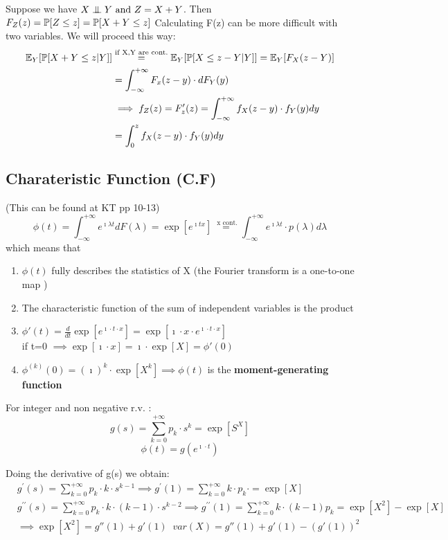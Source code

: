 Suppose we have $X \mathrel{\perp\mspace{-10mu}\perp} Y \text{ and } Z=X+Y$. Then $F_Z(z) = \mathbb{P}[Z\le z] = \mathbb{P}[X+Y \le z]$
Calculating F(z) can be more difficult with two variables. We will proceed this way:
\\
\begin{equation}\begin{split}
    \mathbb{E}_{Y}[\mathbb{P}[X+Y \le z | Y]]  &\stackrel{\text{if X,Y are cont.}}{=} \mathbb{E}_Y [\mathbb{P}[X \le z - Y | Y]] = \mathbb{E}_Y[F_X(z-Y)]\\
    &=\int_{-\infty}^{+\infty}F_x(z-y) \cdot dF_Y(y) \\
    &\implies f_Z(z) = F'_z(z) = \int_{-\infty}^{+\infty}{f_X(z-y)\cdot f_Y(y) dy} \\
    &=\int_{0}^{z}{f_X(z-y) \cdot f_Y(y) dy}
  \end{split}
\end{equation}


\subsection{Charateristic Function (C.F)}
(This can be found at KT pp 10-13)
\begin{equation}\phi(t) = \int_{-\infty}^{+\infty}e^{\imath \lambda t} dF(\lambda) = \exp[e^{\imath t x}]\stackrel{\text{ x cont.}}{=}
  \int_{-\infty}^{+\infty}e^{\imath \lambda t} \cdot p(\lambda) d\lambda
\end{equation}
which means that
\begin{enumerate}
  \item $\phi(t)$ fully describes the statistics of X (the Fourier transform is a  one-to-one map )
  \item The characteristic function of the sum of independent variables is the product
  \item $\phi'(t)=\frac{d}{dt} \exp[e^{\imath \cdot t \cdot x}]=\exp[\imath \cdot x \cdot e^{\imath \cdot t \cdot x}]$ \\
  if t=0 $\implies \exp[\imath \cdot x]=\imath \cdot \exp[ X] = \phi'(0)$
  \item $\phi^{(k)}(0) = (\imath)^k \cdot \exp[X^k] \implies \phi(t)$ is the \textbf{moment-generating function}
\end{enumerate}


For integer and non negative r.v. :
$$g(s)=\sum\limits_{k=0}^{+\infty}p_k \cdot s^k = \exp[S^X]$$
$$\phi(t) = g(e^{\imath \cdot t})$$

Doing the derivative of g(s) we obtain:
\begin{equation}
  \begin{split}
    & g^\prime(s) = \sum\limits_{k=0}^{+\infty} p_k \cdot k \cdot s^{k-1}
    \implies g^\prime(1) = \sum\limits_{k=0}^{+\infty} k \cdot p_k \cdot = \exp[X] \\
    & g^{\prime\prime}(s) = \sum\limits_{k=0}^{+\infty} p_k \cdot k \cdot (k-1) \cdot s^{k-2}
    \implies g^{\prime\prime}(1) = \sum\limits_{k=0}^{+\infty} k \cdot(k-1) p_k = \exp[X^2]-\exp[X] \\
    &\implies \exp[X^2] = g''(1)+g'(1) \; \; var(X) = g''(1)+g'(1)-(g'(1))^2
  \end{split}
\end{equation}

